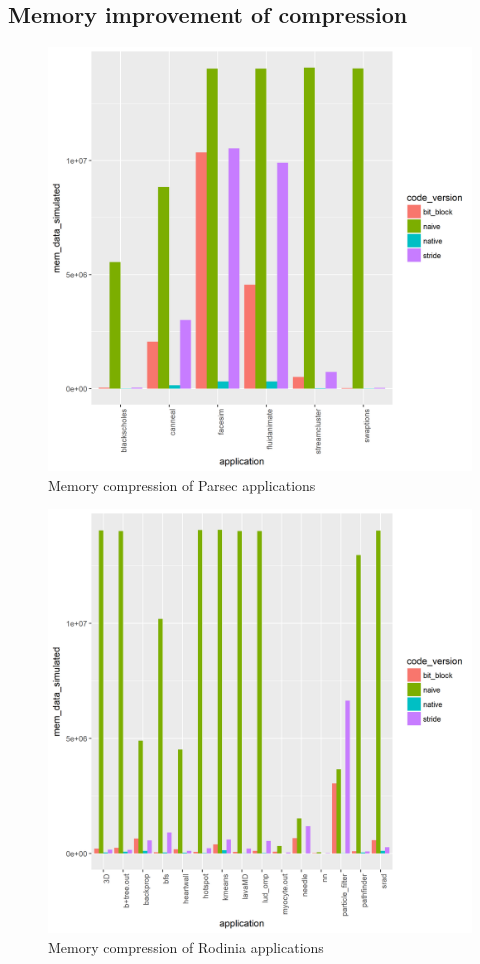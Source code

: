 \documentclass[12pt,twoside]{reedthesis}
\begin{document}
		\subsection{Memory improvement of compression}
		
		
		\begin{figure}[h]
			\caption{Memory compression of Parsec applications}
			\label{fig:mem-comp-plot-parsec}
			\includegraphics[scale=0.6]{plots/mem_parsec_plot.png}
		\end{figure}
		\begin{figure}[h]
			\caption{Memory compression of Rodinia applications}
			\label{fig:mem-comp-plot-rodinia}
			\includegraphics[scale=0.6]{plots/mem_rodinia_plot.png}
		\end{figure}
	
\end{document}
